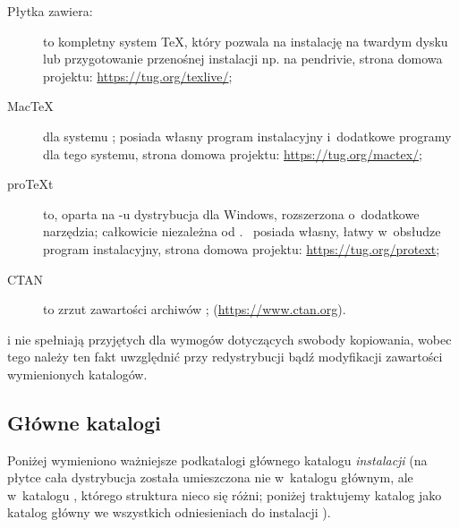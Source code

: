 \documentclass{article}
\begin{document}
Płytka \TK{} \DVD{} zawiera:

\begin{description}

\item [\TL] to kompletny system \TeX, który pozwala na instalację na
twardym dysku lub przygotowanie przenośnej instalacji np. na pendrivie,
strona domowa projektu: \url{https://tug.org/texlive/};

\item [Mac\TeX] dla systemu \MacOSX; posiada własny program instalacyjny
i~dodatkowe programy dla tego systemu, strona domowa projektu:
\url{https://tug.org/mactex/};


\item [pro\TeX{}t] to, oparta na  \MIKTEX-u dystrybucja dla Windows,
rozszerzona o~dodatkowe narzędzia; całkowicie niezależna od \TL.
\ProTeXt\ posiada własny, łatwy w~obsłudze program instalacyjny,
 strona domowa projektu: \url{https://tug.org/protext};

\item [CTAN] to zrzut zawartości archiwów \CTAN{};
(\url{https://www.ctan.org}).

\end{description}
\CTAN i  nie spełniają przyjętych dla
\TL{} wymogów dotyczących swobody kopiowania, wobec tego należy ten fakt
uwzględnić przy redystrybucji bądź modyfikacji zawartości wymienionych
katalogów.

\subsection{Główne katalogi \protect\TL}
\label{sec:tld}

Poniżej wymieniono ważniejsze podkatalogi głównego katalogu \emph{instalacji}
\TL (na płytce \TK{} \DVD{} cała dystrybucja \TL{} została umieszczona nie
w~katalogu głównym, ale w~katalogu , którego struktura nieco
się różni; poniżej traktujemy katalog  jako katalog główny
we wszystkich odniesieniach do instalacji \TL).
\end{document}
